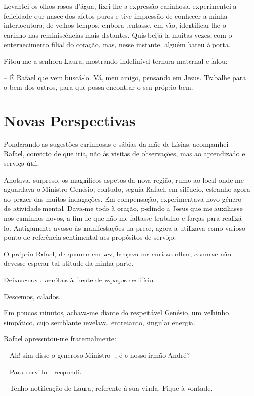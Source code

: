 \documentclass[portuguese,12pt,a4paper]{scrbook}
\begin{document}
	Levantei os olhos rasos d'água, fixei-lhe a expressão carinhosa, experimentei a felicidade que nasce dos afetos puros e tive impressão de conhecer a minha interlocutora, de velhos tempos, embora tentasse, em vão, identificar-lhe o carinho nas reminiscências mais distantes. Quis beijá-la muitas vezes, com o enternecimento filial do coração, mas, nesse instante, alguém bateu à porta.
	
	Fitou-me a senhora Laura, mostrando indefinível ternura maternal e falou:
	
	– É Rafael que vem buscá-lo. Vá, meu amigo, pensando em Jesus. Trabalhe para o bem dos outros, para que possa encontrar o seu próprio bem.
	
	
	\chapter{Novas Perspectivas}
	
	Ponderando as sugestões carinhosas e sábias da mãe de Lísias, acompanhei Rafael, convicto de que iria, não às visitas de observações, mas ao aprendizado e serviço útil.
	
	Anotava, surpreso, os magníficos aspetos da nova região, rumo ao local onde me aguardava o Ministro Genésio; contudo, seguia Rafael, em silêncio, estranho agora ao prazer das muitas indagações. Em compensação, experimentava novo género de atividade mental. Dava-me todo à oração, pedindo a Jesus que me auxiliasse nos caminhos novos, a fim de que não me faltasse trabalho e forças para realizá-lo. Antigamente avesso às manifestações da prece, agora a utilizava como valioso ponto de referência sentimental aos propósitos de serviço.
	
	O próprio Rafael, de quando em vez, lançava-me curioso olhar, como se não devesse esperar tal atitude da minha parte.
	
	Deixou-nos o aeróbus à frente de espaçoso edifício.
	
	Descemos, calados.
	
	Em poucos minutos, achava-me diante do respeitável Genésio, um velhinho simpático, cujo semblante revelava, entretanto, singular energia.
	
	Rafael apresentou-me fraternalmente:
	
	– Ah! sim disse o generoso Ministro -, é o nosso irmão André?
	
	– Para servi-lo - respondi.
	
	– Tenho notificação de Laura, referente à sua vinda. Fique à vontade.
	
\end{document}
